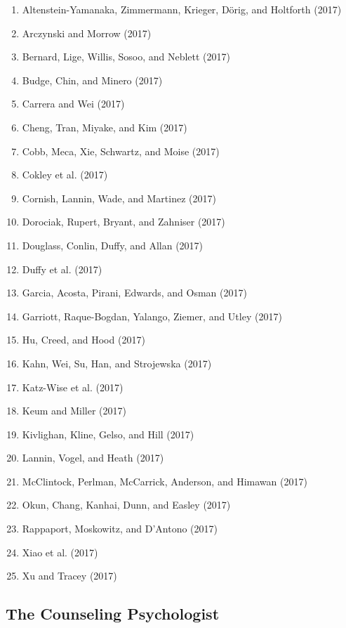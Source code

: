 \documentclass[english,man]{apa6}
\providecommand{\tightlist}{%
  \setlength{\itemsep}{0pt}\setlength{\parskip}{0pt}}
\begin{document}
\begin{enumerate}
\def\labelenumi{\arabic{enumi})}
\tightlist
\item
  Altenstein-Yamanaka, Zimmermann, Krieger, Dörig, and Holtforth (2017)
\item
  Arczynski and Morrow (2017)
\item
  Bernard, Lige, Willis, Sosoo, and Neblett (2017)
\item
  Budge, Chin, and Minero (2017)
\item
  Carrera and Wei (2017)
\item
  Cheng, Tran, Miyake, and Kim (2017)
\item
  Cobb, Meca, Xie, Schwartz, and Moise (2017)
\item
  Cokley et al. (2017)
\item
  Cornish, Lannin, Wade, and Martinez (2017)
\item
  Dorociak, Rupert, Bryant, and Zahniser (2017)
\item
  Douglass, Conlin, Duffy, and Allan (2017)
\item
  Duffy et al. (2017)
\item
  Garcia, Acosta, Pirani, Edwards, and Osman (2017)
\item
  Garriott, Raque-Bogdan, Yalango, Ziemer, and Utley (2017)
\item
  Hu, Creed, and Hood (2017)
\item
  Kahn, Wei, Su, Han, and Strojewska (2017)
\item
  Katz-Wise et al. (2017)
\item
  Keum and Miller (2017)
\item
  Kivlighan, Kline, Gelso, and Hill (2017)
\item
  Lannin, Vogel, and Heath (2017)
\item
  McClintock, Perlman, McCarrick, Anderson, and Himawan (2017)
\item
  Okun, Chang, Kanhai, Dunn, and Easley (2017)
\item
  Rappaport, Moskowitz, and D'Antono (2017)
\item
  Xiao et al. (2017)
\item
  Xu and Tracey (2017)
\end{enumerate}

\subsection{The Counseling
Psychologist}\label{the-counseling-psychologist}
\end{document}
